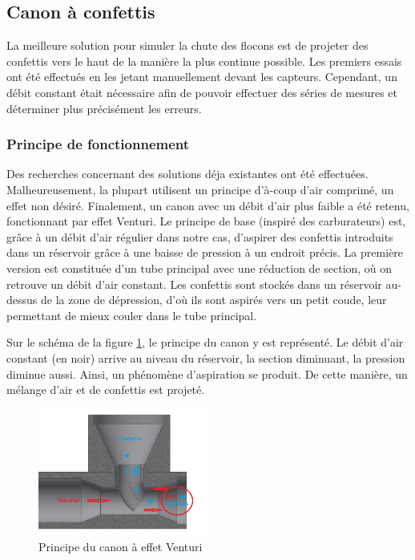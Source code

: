 \subsection{Canon à confettis}

La meilleure solution pour simuler la chute des flocons est de projeter des confettis vers le haut 
de la manière la plus continue possible. Les premiers essais ont été effectués en les jetant manuellement 
devant les capteurs. Cependant, un débit constant était nécessaire afin de pouvoir effectuer des séries de
mesures et déterminer plus précisément les erreurs. 

\subsubsection{Principe de fonctionnement}

Des recherches concernant des solutions déja existantes ont été effectuées. Malheureusement, la plupart 
utilisent un principe d'à-coup d'air comprimé, un effet non désiré. Finalement, un canon avec un 
débit d'air plus faible a été retenu, fonctionnant par effet Venturi.
Le principe de base (inspiré des carburateurs) est, grâce à un débit d’air régulier dans 
notre cas, d’aspirer des confettis introduits dans un réservoir grâce à une baisse de pression à un 
endroit précis. La première version est constituée d’un tube principal avec une réduction de section, où
on retrouve un débit d'air constant. Les confettis sont stockés dans un réservoir au-dessus de la zone 
de dépression, d'où ils sont aspirés vers un petit coude, leur permettant de mieux couler dans le 
tube principal.\par 
Sur le schéma de la figure \ref{fig:venturi}, le principe du canon y est représenté. Le débit d’air constant 
(en noir) arrive au niveau du réservoir, la section diminuant, la pression diminue aussi. Ainsi, un phénomène 
d’aspiration se produit. De cette manière, un mélange d'air et de confettis est projeté.

\begin{figure}[H]
    \centering
    \includegraphics[width=0.5\textwidth]{Images/photos_PGA/venturi_v1b.PNG}
    \caption{Principe du canon à effet Venturi}
    \label{fig:venturi}
\end{figure}

